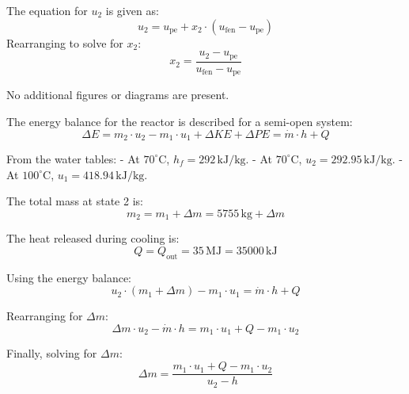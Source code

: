 The equation for \( u_2 \) is given as:  
\[
u_2 = u_{\text{pe}} + x_2 \cdot (u_{\text{fen}} - u_{\text{pe}})
\]  
Rearranging to solve for \( x_2 \):  
\[
x_2 = \frac{u_2 - u_{\text{pe}}}{u_{\text{fen}} - u_{\text{pe}}}
\]  

No additional figures or diagrams are present.

The energy balance for the reactor is described for a semi-open system:  
\[
\Delta E = m_2 \cdot u_2 - m_1 \cdot u_1 + \Delta KE + \Delta PE = \dot{m} \cdot h + Q
\]  

From the water tables:  
- At \( 70^\circ\text{C} \), \( h_f = 292 \, \text{kJ/kg} \).  
- At \( 70^\circ\text{C} \), \( u_2 = 292.95 \, \text{kJ/kg} \).  
- At \( 100^\circ\text{C} \), \( u_1 = 418.94 \, \text{kJ/kg} \).  

The total mass at state 2 is:  
\[
m_2 = m_1 + \Delta m = 5755 \, \text{kg} + \Delta m
\]  

The heat released during cooling is:  
\[
Q = Q_{\text{out}} = 35 \, \text{MJ} = 35000 \, \text{kJ}
\]  

Using the energy balance:  
\[
u_2 \cdot (m_1 + \Delta m) - m_1 \cdot u_1 = \dot{m} \cdot h + Q
\]  

Rearranging for \( \Delta m \):  
\[
\Delta m \cdot u_2 - \dot{m} \cdot h = m_1 \cdot u_1 + Q - m_1 \cdot u_2
\]  

Finally, solving for \( \Delta m \):  
\[
\Delta m = \frac{m_1 \cdot u_1 + Q - m_1 \cdot u_2}{u_2 - h}
\]